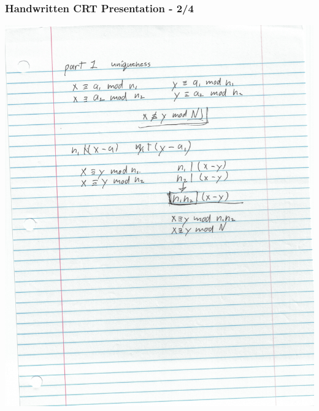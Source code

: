 \documentclass[aspectratio=169]{beamer}
\begin{document}
\begin{frame}[fragile]
\frametitle{Handwritten CRT Presentation - 2/4}
\includegraphics[height=0.8\paperheight]{jacques_page2.jpg}
\end{frame}
\end{document}
